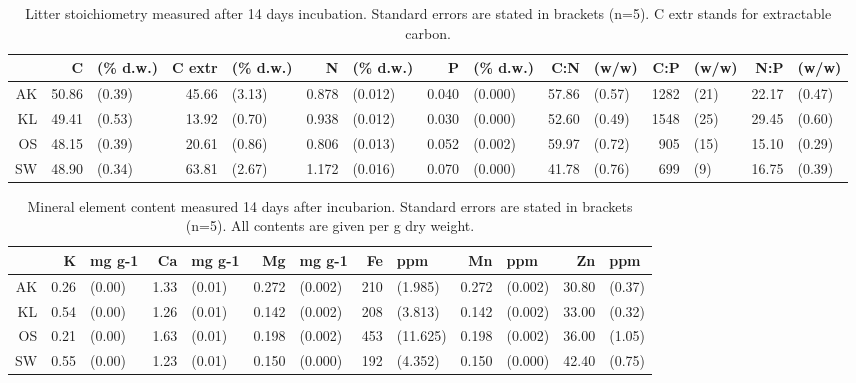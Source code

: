 \documentclass[authoryear,preprint,review,12pt]{elsarticle}
\begin{document}
\newpage
\begin{table}[h!]
\begin{center}
\caption{Litter stoichiometry measured after 14 days incubation. Standard errors are stated in brackets (n=5). C extr stands for extractable carbon.}
\label{initstoech}
{\tiny
\begin{tabular}{rrlrlrlrlrlrlrl}
  \hline
 & C & (\% d.w.) & C extr & (\% d.w.) & N & (\% d.w.) & P & (\% d.w.) & C:N & (w/w) & C:P & (w/w) & N:P & (w/w) \\ 
  \hline
AK & 50.86 & (0.39) & 45.66 & (3.13) & 0.878 &  (0.012) & 0.040 & (0.000) & 57.86 &  (0.57) & 1282 & (21) & 22.17 & (0.47) \\ 
  KL & 49.41 & (0.53) & 13.92 & (0.70) & 0.938 &  (0.012) & 0.030 & (0.000) & 52.60 &  (0.49) & 1548 & (25) & 29.45 & (0.60) \\ 
  OS & 48.15 & (0.39) & 20.61 & (0.86) & 0.806 &  (0.013) & 0.052 & (0.002) & 59.97 &  (0.72) & 905 & (15) & 15.10 & (0.29) \\ 
  SW & 48.90 & (0.34) & 63.81 & (2.67) & 1.172 &  (0.016) & 0.070 & (0.000) & 41.78 &  (0.76) & 699 & (9) & 16.75 & (0.39) \\ 
   \hline
\end{tabular}
}
\end{center}
\end{table}
\newpage
\begin{table}[h!]
\begin{center}
\caption{Mineral element content measured 14 days after incubarion. Standard errors are stated in brackets (n=5). All contents are given per g dry weight.}
\label{initstoech}
{\tiny
\begin{tabular}{rrlrlrlrlrlrl}
  \hline
 & K & mg g-1 & Ca & mg g-1 & Mg & mg g-1 & Fe & ppm & Mn & ppm & Zn & ppm \\ 
  \hline
AK & 0.26 & (0.00) & 1.33 & (0.01) & 0.272 &  (0.002) & 210 & (1.985) & 0.272 &  (0.002) & 30.80 & (0.37) \\ 
  KL & 0.54 & (0.00) & 1.26 & (0.01) & 0.142 &  (0.002) & 208 & (3.813) & 0.142 &  (0.002) & 33.00 & (0.32) \\ 
  OS & 0.21 & (0.00) & 1.63 & (0.01) & 0.198 &  (0.002) & 453 & (11.625) & 0.198 &  (0.002) & 36.00 & (1.05) \\ 
  SW & 0.55 & (0.00) & 1.23 & (0.01) & 0.150 &  (0.000) & 192 & (4.352) & 0.150 &  (0.000) & 42.40 & (0.75) \\ 
   \hline
\end{tabular}
}
\end{center}
\end{table}
\end{document}
